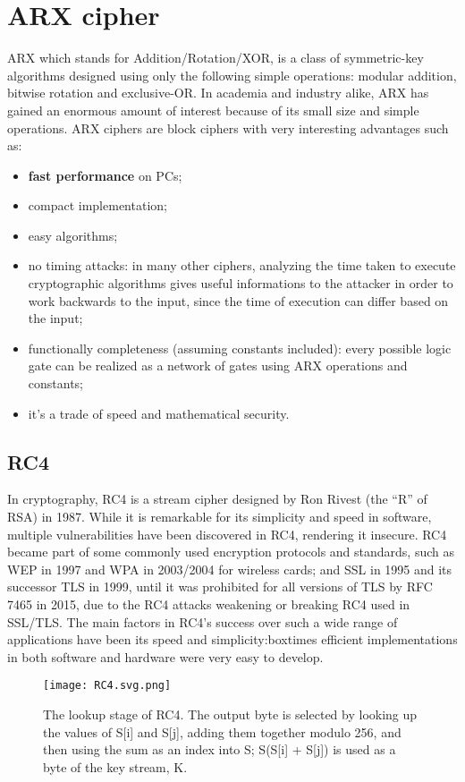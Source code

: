 \documentclass{article}
\begin{document}
\section{ARX cipher}
ARX which stands for Addition/Rotation/XOR, is a class of symmetric-key algorithms designed using only the following simple operations: modular addition, bitwise rotation and exclusive-OR. In academia and industry alike, ARX has gained an enormous amount of interest because of its small size and simple operations.
ARX ciphers are block ciphers with very interesting advantages such as:
\begin{itemize}
\item \textbf{fast performance} on PCs;
\item compact implementation;
\item easy algorithms;
\item no timing attacks: in many other ciphers, analyzing the time taken to execute cryptographic algorithms gives useful informations to the attacker in order to work backwards to the input, since the time of execution can differ based on the input;
\item functionally completeness (assuming constants included): every possible logic gate can be realized as a network of gates using ARX operations and constants;
\item it's a trade of speed and mathematical security.
\end{itemize}
\subsection{RC4}
In cryptography, RC4 is a stream cipher designed by Ron Rivest (the “R” of RSA) in 1987.  While it is remarkable for its simplicity and speed in software, multiple vulnerabilities have been discovered in RC4, rendering it insecure. RC4 became part of some commonly used encryption protocols and standards, such as WEP in 1997 and WPA in 2003/2004 for wireless cards; and SSL in 1995 and its successor TLS in 1999, until it was prohibited for all versions of TLS by RFC 7465 in 2015, due to the RC4 attacks weakening or breaking RC4 used in SSL/TLS. The main factors in RC4's success over such a wide range of applications have been its speed and simplicity:boxtimes efficient implementations in both software and hardware were very easy to develop.
\begin{figure}[H]
	\begin{center}
  		\texttt{[image: RC4.svg.png]} 
 	\end{center}
 	\caption{The lookup stage of RC4. The output byte is selected by looking up the values of S[i] and S[j], adding them together modulo 256, and then using the sum as an index into S; S(S[i] + S[j]) is used as a byte of the key stream, K.}
\end{figure}
\newpage
\end{document}
